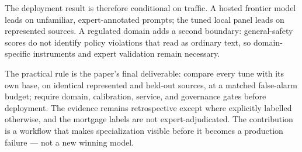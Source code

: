 \documentclass[11pt]{article}
\begin{document}
The deployment result is therefore conditional on traffic. A hosted frontier model leads on unfamiliar,
expert-annotated prompts; the tuned local panel leads on represented sources. A regulated domain adds a
second boundary: general-safety scores do not identify policy violations that read as ordinary text, so
domain-specific instruments and expert validation remain necessary.

The practical rule is the paper's final deliverable: compare every tune with its own base, on identical
represented and held-out sources, at a matched false-alarm budget; require domain, calibration, service,
and governance gates before deployment. The evidence remains retrospective except where explicitly
labelled otherwise, and the mortgage labels are not expert-adjudicated. The contribution is a workflow
that makes specialization visible before it becomes a production failure --- not a new winning model.

\clearpage
\appendix



\end{document}

